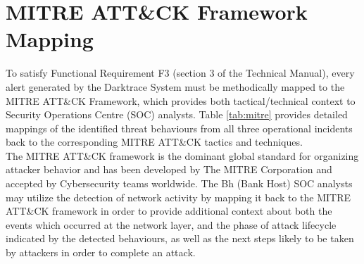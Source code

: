 \documentclass[12pt,a4paper]{report}
\begin{document}
\section{MITRE ATT\&CK Framework Mapping}
To satisfy Functional Requirement F3 (section 3 of the Technical Manual), every alert generated by the Darktrace System must be methodically mapped to the MITRE ATT\&CK Framework, which provides both tactical/technical context to Security Operations Centre (SOC) analysts. Table \ref{tab:mitre} provides detailed mappings of the identified threat behaviours from all three operational incidents back to the corresponding MITRE ATT\&CK tactics and techniques.\\

The MITRE ATT\&CK framework is \cite{mitre_attack} the dominant global standard for organizing attacker behavior and has been developed by The MITRE Corporation and accepted by Cybersecurity teams worldwide. The Bh (Bank Host) SOC analysts may utilize the detection of network activity by mapping it back to the MITRE ATT\&CK framework in order to provide additional context about both the events which occurred at the network layer, and the phase of attack lifecycle indicated by the detected behaviours, as well as the next steps likely to be taken by attackers in order to complete an attack.

\renewcommand{\arraystretch}{1.6}
\end{document}
